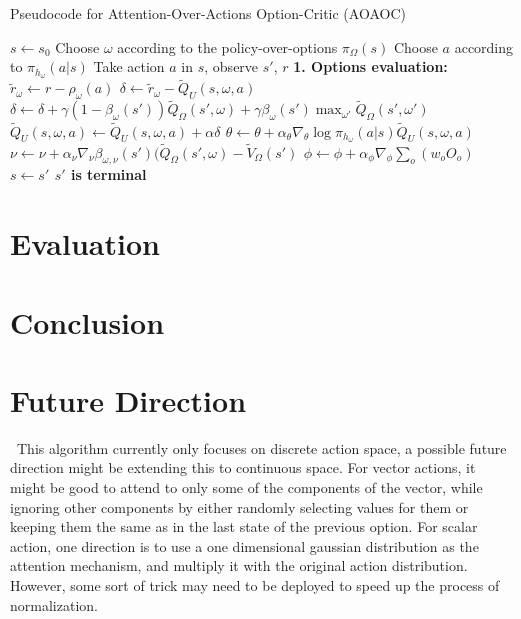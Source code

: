 \documentclass{article}
\begin{document}
	\begin{algorithm}[H]
	\caption{Pseudocode for Attention-Over-Actions Option-Critic (AOAOC)}
	\begin{algorithmic}
		\vspace{1.5mm}
		\State $s \leftarrow s_0$
		\State Choose $\omega$ according to the policy-over-options $\pi_\Omega(s)$
		\Repeat
		\State Choose $a$ according to $\pi_{h_\omega}(a|s)$
		\State Take action $a$ in $s$, observe $s'$, $r$\vspace{3mm}
		\State \bfseries{1. Options evaluation:}
		\State $\widetilde{r}_\omega\leftarrow r-\rho_\omega(a)$
		\State \normalfont $\delta \leftarrow \widetilde{r}_\omega - \widetilde{Q}_U(s,\omega,a)$
		\State $\delta \leftarrow \delta+\gamma(1-\beta_\omega(s'))\widetilde{Q}_\Omega(s',\omega)+\gamma \beta_\omega(s')\max_{\omega'}\widetilde{Q}_\Omega(s',\omega')$
		\EndIf
		\State $\widetilde{Q}_U(s,\omega,a)\leftarrow \widetilde{Q}_U(s,\omega,a) + \alpha \delta$
		\vspace{3mm}
		\State $\theta \leftarrow \theta + \alpha_\theta \nabla_\theta \log \pi_{h_\omega}(a|s)\widetilde{Q}_U(s,\omega,a)$
		\State $\nu \leftarrow \nu + \alpha_\nu \nabla_\nu \beta_{\omega,\nu}(s')(\widetilde{Q}_\Omega(s',\omega)-\widetilde{V}_\Omega(s')$
		\State \normalfont $\phi \leftarrow \phi + \alpha_\phi \nabla_\phi \sum_{o} (w_o O_o)$
		\EndIf
		\State $s \leftarrow s'$
		\Until $s'$ is terminal
		
	\end{algorithmic}
	\end{algorithm}
	\section{Evaluation}
	\section{Conclusion}
	\section{Future Direction}
	\qquad \ This algorithm currently only focuses on discrete action space, a possible future direction might be extending this to continuous space. For vector actions, it might be good to attend to only some of the components of the vector, while ignoring other components by either randomly selecting values for them or keeping them the same as in the last state of the previous option. For scalar action, one direction is to use a one dimensional gaussian distribution as the attention mechanism, and multiply it with the original action distribution. However, some sort of trick may need to be deployed to speed up the process of normalization.
\end{document}
